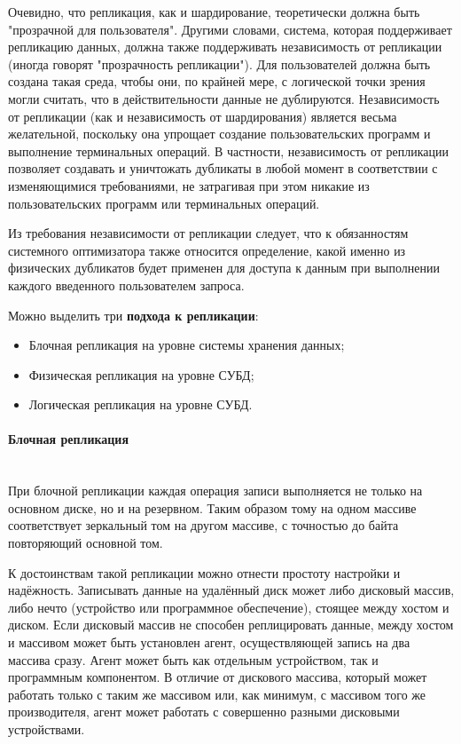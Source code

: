 Очевидно, что репликация, как и шардирование, теоретически должна быть "прозрачной для пользователя". Другими словами,
система, которая поддерживает репликацию данных, должна также поддерживать независимость от репликации (иногда говорят
"прозрачность репликации"). Для пользователей должна быть создана такая среда, чтобы они, по крайней мере, с логической
точки зрения могли считать, что в действительности данные не дублируются. Независимость от репликации (как и
независимость от шардирования) является весьма желательной, поскольку она упрощает создание пользовательских программ и
выполнение терминальных операций. В частности, независимость от репликации позволяет создавать и уничтожать дубликаты в
любой момент в соответствии с изменяющимися требованиями, не затрагивая при этом никакие из пользовательских программ
или терминальных операций.

Из требования независимости от репликации следует, что к обязанностям системного оптимизатора также относится
определение, какой именно из физических дубликатов будет применен для доступа к данным при выполнении каждого
введенного пользователем запроса. \autocite{IntroBD2014}

Можно выделить три \textbf{подхода к репликации}:
\begin{itemize}
    \item Блочная репликация на уровне системы хранения данных;
    \item Физическая репликация на уровне СУБД;
    \item Логическая репликация на уровне СУБД.
\end{itemize}

\paragraph{Блочная репликация} ~\\
При блочной репликации каждая операция записи выполняется не только на основном диске, но и на резервном. Таким образом
тому на одном массиве соответствует зеркальный том на другом массиве, с точностью до байта повторяющий основной том.

К достоинствам такой репликации можно отнести простоту настройки и надёжность. Записывать данные на удалённый диск может
либо дисковый массив, либо нечто (устройство или программное обеспечение), стоящее между хостом и диском. Если дисковый
массив не способен реплицировать данные, между хостом и массивом может быть установлен агент, осуществляющей запись на
два массива сразу. Агент может быть как отдельным устройством, так и программным компонентом. В отличие от дискового
массива, который может работать только с таким же массивом или, как минимум, с массивом того же производителя, агент
может работать с совершенно разными дисковыми устройствами.

